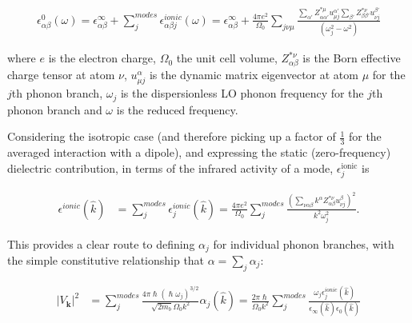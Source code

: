 \begin{equation}
    \begin{gathered}
    \epsilon^0_{\alpha \beta}(\omega) = \epsilon^{\infty}_{\alpha \beta} + \sum_{j}^{modes} \epsilon^{ionic}_{\alpha \beta j}(\omega)
    = \epsilon^{\infty}_{\alpha \beta} + \frac{4\pi e^2}{\Omega_0} \sum_{j \nu\mu}\frac{ \sum_{\alpha'}Z^{*\mu}_{\alpha\alpha'} u_{\mu j}^{\alpha'}  \sum_{\beta'}Z^{*\nu}_{\beta\beta'}  u_{\nu j}^{\beta'}}{\left(\omega_{j}^2 - \omega^2   \right)}
    \end{gathered}
\end{equation}

where $e$ is the electron charge, $\Omega_0$ the unit cell volume, $Z^{*\nu}_{\alpha \beta}$ is the Born effective charge tensor at atom $\nu$, $u^\alpha_{\mu j}$ is the dynamic matrix eigenvector at atom $\mu$ for the $j$th phonon branch, $\omega_{j}$ is the dispersionless LO phonon frequency for the $j$th phonon branch and $\omega$ is the reduced frequency. 

Considering the isotropic case (and therefore picking up a factor of $\frac{1}{3}$ for the averaged interaction with a dipole), and expressing the static (zero-frequency) dielectric contribution, in terms of the infrared activity of a mode, $\epsilon^{\text{ionic}}_{j}$ is 

\begin{equation}
\begin{split}
    \epsilon^{ionic}(\hat{k}) &= \sum_j^{modes} \epsilon^{ionic}_{j}(\hat{k})
    = \frac{4\pi e^2}{\Omega_0} \sum_{j}^{modes} \frac{\left(\sum_{\nu\alpha\beta} k^\alpha Z^{*\nu}_{\alpha \beta} u^\beta_{\nu j}\right)^2}{k^2 \omega_{j}^2}.
\end{split}
\end{equation}

This provides a clear route to defining $\alpha_j$ for individual phonon branches, with the simple constitutive relationship that $\alpha=\sum_j \alpha_j$:

\begin{equation}
    \begin{split}
    |V_\mathbf{k}|^2 &= \sum_j^{modes} \frac{4\pi \hslash (\hslash \omega_{j})^{3/2}}{\sqrt{2 m_b} \Omega_0 k^2} \alpha_j(\hat{k})
    = \frac{2\pi \hslash}{\Omega_0 k^2} \sum_j^{modes}\frac{\omega_{j} \epsilon^{ionic}_j(\hat{k})}{\epsilon_\infty(\hat{k}) \epsilon_0(\hat{k})}
    \end{split}
\end{equation}

